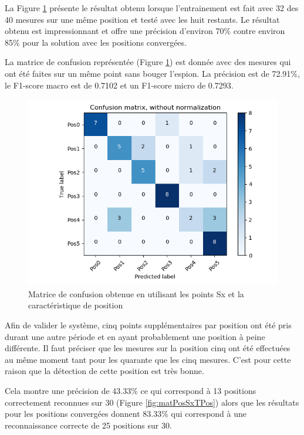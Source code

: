 La Figure \ref{fig:matPosSxPos} présente le résultat obtenu lorsque l'entrainement est fait avec 32 des 40 mesures sur une même position et testé avec les huit restants. Le résultat obtenu est impressionnant et offre une précision d'environ 70\% contre environ 85\% pour la solution avec les positions convergées. 

La matrice de confusion représentée (Figure \ref{fig:matPosSxPos}) est donnée avec des mesures qui ont été faites sur un même point sans bouger l'espion. La précision est de 72.91\%, le F1-score macro est de 0.7102 et un F1-score micro de 0.7293.  
\begin{figure}[htp]
 \begin{center}
  \includegraphics[scale=0.5]{figures/mat_pos_Sx_pos.png}
  \caption{Matrice de confusion obtenue en utilisant les points Sx et la caractéristique de position}
  \label{fig:matPosSxPos} %
 \end{center}
\end{figure}

Afin de valider le système, cinq points supplémentaires par position ont été pris durant une autre période et en ayant probablement une position à peine différente. Il faut préciser que les mesures sur la position cinq ont été effectuées au même moment tant pour les quarante que les cinq mesures. C'est pour cette raison que la détection de cette position est très bonne. 

Cela montre une précision de 43.33\% ce qui correspond à 13 positions correctement reconnues sur 30 (Figure \ref{fig:matPosSxTPos}) alors que les résultats pour les positions convergées donnent 83.33\% qui correspond à une reconnaissance correcte de 25 positions sur 30.

